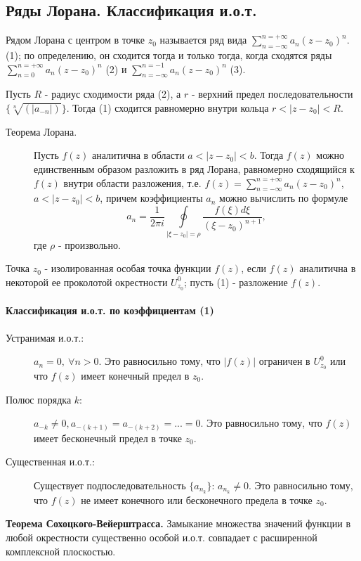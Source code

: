 \documentclass[a4paper,12pt]{scrartcl}
\begin{document}
\subsection{Ряды Лорана. Классификация и.о.т.}
Рядом Лорана с центром в точке $z_0$ называется ряд вида $\sum\limits_{n=-\infty}^{n=+\infty}a_n(z-z_0)^n$. (1); по определению, он сходится тогда и только тогда, когда сходятся ряды $\sum\limits_{n=0}^{n=+\infty}a_n(z-z_0)^n$ (2) и $\sum\limits_{n=-\infty}^{n= -1}a_n(z-z_0)^n$ (3). 

Пусть $R$ - радиус сходимости ряда (2), а $r$ - верхний предел последовательности $\{\sqrt[n]{(|a_{-n}|)}\}$. Тогда (1) сходится равномерно внутри кольца $r < |z-z_0| < R$.

\begin{description}
 \item [Теорема Лорана.] Пусть $f(z)$ аналитична в области $a < |z-z_0| < b$. Тогда $f(z)$ можно единственным образом разложить в ряд Лорана, равномерно сходящийся к $f(z)$ внутри области разложения, т.е. $f(z) = \sum\limits_{n=-\infty}^{n=+\infty}a_n(z-z_0)^n$, $a < |z-z_0| < b$, причем коэффициенты $a_n$ можно вычислить по формуле 
$$a_n = \dfrac{1}{2\pi i}\oint\limits_{|\xi-z_0|=\rho}\dfrac{f(\xi)d\xi}{(\xi-z_0)^{n+1}},$$ где $\rho$ - произвольно.
\end{description}
Точка $z_0$ - изолированная особая точка функции $f(z)$, если $f(z)$ аналитична в некоторой ее проколотой окрестности $U_{z_0}^0$; пусть (1) - разложение $f(z)$.

\paragraph{Классификация и.о.т. по коэффициентам (1)}

\begin{description}
 \item[Устранимая и.о.т.:]  ${a_n = 0, \ \forall n > 0}$. Это равносильно тому, что $|f(z)|$ ограничен в $U_{z_0}^0$ или что $f(z)$ имеет конечный предел в $z_0$.
 \item[Полюс порядка $k$:] $a_{-k} \neq 0, a_{-(k+1)}=a_{-(k+2)}=...=0$. Это равносильно тому, что $f(z)$ имеет бесконечный предел в точке $z_0$.
 \item[Существенная и.о.т.:] Существует подпоследовательность $\{a_{n_k}\}$: $a_{n_k} \neq 0$. Это равносильно тому, что $f(z)$ не имеет конечного или бесконечного предела в точке $z_0$.
\end{description}
\textbf{Теорема Сохоцкого-Вейерштрасса.} Замыкание множества значений функции в любой окрестности существенно особой и.о.т. совпадает с расширенной комплексной плоскостью.
\end{document}
